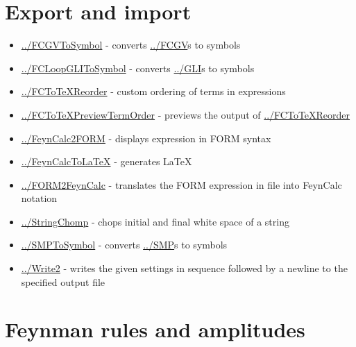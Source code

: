 \documentclass[../FeynCalcManual.tex]{subfiles}
\begin{document}
\hypertarget{export and import}{
\section{Export and import}\label{export and import}}

\begin{itemize}
\tightlist
\item
  \hyperlink{../fcgvtosymbol}{../FCGVToSymbol} - converts
  \hyperlink{../fcgv}{../FCGV}s to symbols
\item
  \hyperlink{../fcloopglitosymbol}{../FCLoopGLIToSymbol} - converts
  \hyperlink{../gli}{../GLI}s to symbols
\item
  \hyperlink{../fctotexreorder}{../FCToTeXReorder} - custom ordering of
  terms in expressions
\item
  \hyperlink{../fctotexpreviewtermorder}{../FCToTeXPreviewTermOrder} -
  previews the output of
  \hyperlink{../fctotexreorder}{../FCToTeXReorder}
\item
  \hyperlink{../feyncalc2form}{../FeynCalc2FORM} - displays expression
  in FORM syntax
\item
  \hyperlink{../feyncalctolatex}{../FeynCalcToLaTeX} - generates LaTeX
\item
  \hyperlink{../form2feyncalc}{../FORM2FeynCalc} - translates the FORM
  expression in file into FeynCalc notation
\item
  \hyperlink{../stringchomp}{../StringChomp} - chops initial and final
  white space of a string
\item
  \hyperlink{../smptosymbol}{../SMPToSymbol} - converts
  \hyperlink{../smp}{../SMP}s to symbols
\item
  \hyperlink{../write2}{../Write2} - writes the given settings in
  sequence followed by a newline to the specified output file
\end{itemize}

\hypertarget{feynman rules and amplitudes}{
\section{Feynman rules and amplitudes}\label{feynman rules and amplitudes}}
\end{document}
